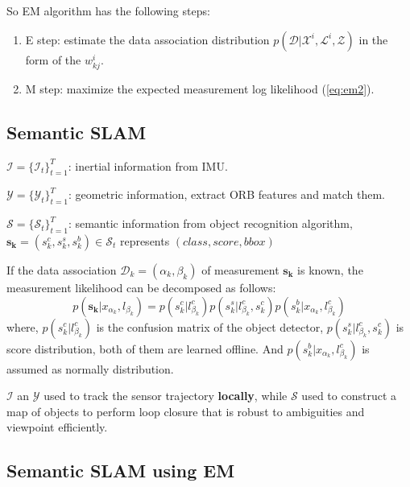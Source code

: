 \documentclass[12pt]{article}
\numberwithin{equation}{section}
\begin{document}
So EM algorithm has the following steps:
\begin{enumerate}
	\item E step: estimate the data association distribution $p(\mathcal{D}|\mathcal{X}^i,\mathcal{L}^i,\mathcal{Z})$ in the form of the $w^i_{kj}$.
	\item M step: maximize the expected measurement log likelihood (\ref{eq:em2}).
\end{enumerate}
\subsection{Semantic SLAM}
$\mathcal{I}=\{\mathcal{I}_t\}^T_{t=1}$: inertial information from IMU. \par
$\mathcal{Y}=\{\mathcal{Y}_t\}^T_{t=1}$: geometric information, extract ORB features and match them. \par
$\mathcal{S}=\{\mathcal{S}_t\}^T_{t=1}$: semantic information  from object recognition algorithm, $\bm{s_k}=(s^c_k, s^s_k, s^b_k) \in \mathcal{S}_t$ represents $(class, score, bbox)$ \par
If the data association $\mathcal{D}_k=(\alpha_k, \beta_k)$ of measurement $\bm{s_k}$ is known, the measurement likelihood can be decomposed as follows:
\begin{equation}
	p(\bm{s_k}|x_{\alpha_k}, l_{\beta_k})=p(s^c_k|l^c_{\beta_k}) p(s^s_k|l^c_{\beta_k},s^c_k) p(s^b_k|x_{\alpha_k},l^c_{\beta_k})
\end{equation}
where, $p(s^c_k|l^c_{\beta_k})$ is the confusion matrix of the object detector, $p(s^s_k|l^c_{\beta_k},s^c_k)$ is score distribution, both of them are learned offline. And $p(s^b_k|x_{\alpha_k},l^c_{\beta_k})$ is assumed as normally distribution. \par
$\mathcal{I}$ an $\mathcal{Y}$ used to track the sensor trajectory \textbf{locally}, while $\mathcal{S}$ used to construct a map of objects to perform loop closure that is robust to ambiguities and viewpoint efficiently. \par
\subsection{Semantic SLAM using EM}
\end{document}
